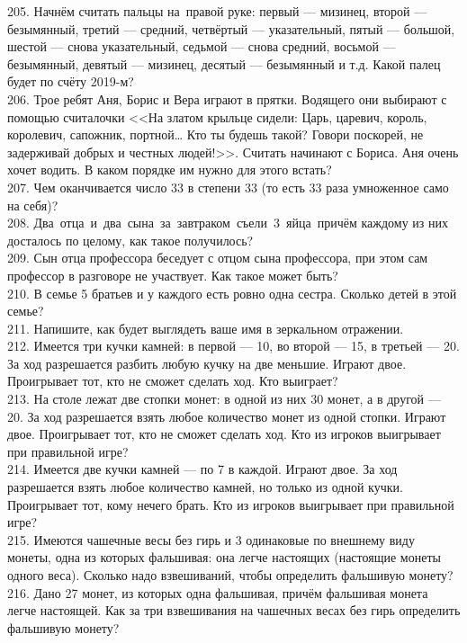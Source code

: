 205. Начнём считать пальцы на правой руке: первый --- мизинец, второй --- безымянный, третий --- средний, четвёртый --- указательный, пятый --- большой, шестой --- снова указательный, седьмой --- снова средний, восьмой --- безымянный, девятый --- мизинец, десятый --- безымянный и т.д. Какой палец будет по счёту 2019-м?\\
206. Трое ребят Аня, Борис и Вера играют в прятки. Водящего они выбирают с помощью считалочки <<На златом крыльце сидели: Царь, царевич, король, королевич, сапожник, портной… Кто ты будешь такой? Говори поскорей, не задерживай добрых и честных людей!>>. Считать начинают с Бориса. Аня очень хочет водить.  В каком порядке им нужно для этого встать?\\
207. Чем оканчивается число 33 в степени 33 (то есть 33 раза умноженное само на себя)?\\
208. Два отца и два сына за завтраком съели 3 яйца причём каждому из них досталось по целому, как такое получилось?\\
209. Сын отца профессора беседует с отцом сына профессора, при этом сам профессор в разговоре не участвует. Как такое может быть?\\
210. В семье 5 братьев и у каждого есть ровно одна сестра. Сколько детей в этой семье?\\
211. Напишите, как будет выглядеть ваше имя в зеркальном отражении.\\
212. Имеется три кучки камней: в первой --- 10, во второй --- 15, в третьей --- 20. За ход разрешается разбить любую кучку на две меньшие. Играют двое. Проигрывает тот, кто не сможет сделать ход. Кто выиграет?\\
213. На столе лежат две стопки монет: в одной из них 30 монет, а в другой --- 20. За ход разрешается взять любое количество монет из одной стопки. Играют двое. Проигрывает тот, кто не сможет сделать ход. Кто из игроков выигрывает при правильной игре?\\
214. Имеется две кучки камней --- по 7 в каждой. Играют двое. За ход разрешается взять любое количество камней, но только из одной кучки. Проигрывает тот, кому нечего брать. Кто из игроков выигрывает при правильной игре?\\
215. Имеются чашечные весы без гирь и 3 одинаковые по внешнему виду монеты, одна из которых фальшивая: она легче настоящих (настоящие монеты одного веса). Сколько надо взвешиваний, чтобы определить фальшивую монету?\\
216. Дано 27 монет, из которых одна фальшивая, причём фальшивая монета легче настоящей. Как за три взвешивания на чашечных весах без гирь определить фальшивую монету?\\

